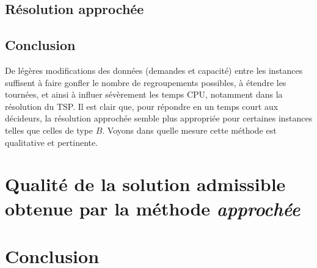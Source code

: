 \documentclass[french, 11pt, a4paper]{article} %
\newcommand{\smb}{\smallbreak}
\begin{document}
\subsection{Résolution approchée}

\subsection{Conclusion}
De légères modifications des données (demandes et capacité) entre les instances suffisent à faire gonfler
le nombre de regroupements possibles, à étendre les tournées,
et ainsi à influer sévèrement les temps CPU, notamment dans la résolution du TSP.
\smb Il est clair que, pour répondre en un temps court aux décideurs, la résolution approchée semble plus
appropriée pour certaines instances telles que celles de type $B$. Voyons dans quelle mesure
cette méthode est qualitative et pertinente.

\section{Qualité de la solution admissible obtenue par la méthode \emph{approchée}}

\section{Conclusion}
\end{document}
